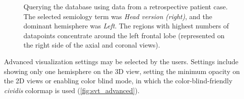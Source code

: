 \begin{figure}
  \centering
  \caption[Querying the database using data from a retrospective patient case]{
    Querying the database using data from a retrospective patient case.
    The selected semiology term was \textit{Head version (right)}, and the dominant hemisphere was \textit{Left}.
    The regions with highest numbers of datapoints concentrate around the left frontal lobe (represented on the right side of the axial and coronal views).
  }
  \label{fig:svt_case_heatmap}
\end{figure}

Advanced visualization settings may be selected by the users.
Settings include
showing only one hemisphere on the 3D view,
setting the minimum opacity on the 2D views or
enabling color blind mode, in which the color-blind-friendly \textit{cividis} colormap is used \cite{nunez_optimizing_2018} (\cref{fig:svt_advanced}).
